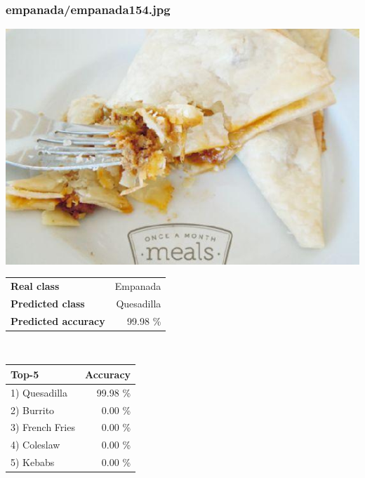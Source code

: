 \subsubsection{empanada/empanada154.jpg}

\begin{minipage}[t]{0.4\textwidth}
	\vspace{0pt}
	\includegraphics[width=\linewidth]{images/evaluation-images/empanada/empanada154.jpg}
\end{minipage}
\hfill
\begin{minipage}[t]{0.5\textwidth}
	\vspace{0pt}\raggedright
	\begin{tabularx}{\textwidth}{X r}
		\small \textbf{Real class} & \small Empanada\\
		\small \textbf{Predicted class} & \small Quesadilla\\
		\small \textbf{Predicted accuracy} & \small 99.98 \%
    \end{tabularx}\\
    
    \vspace{6pt}
	\begin{tabularx}{\textwidth}{X r}
        \small \textbf{Top-5} & \small \textbf{Accuracy} \\
        \hline
		\small 1) Quesadilla & \small 99.98 \%\\\small 2) Burrito & \small 0.00 \%\\\small 3) French Fries & \small 0.00 \%\\\small 4) Coleslaw & \small 0.00 \%\\\small 5) Kebabs & \small 0.00 \%
    \end{tabularx}
\end{minipage}
    

